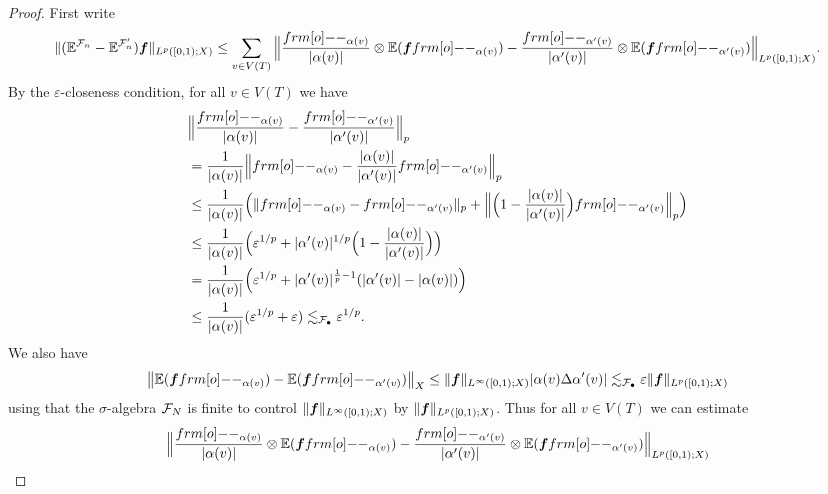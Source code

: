 \begin{proof}
  First write
  \begin{equation*}
    \|(\E^{\mc{F}_{n}} - \E^{\mc{F}_{n}'})\mb{f}\|_{L^p([0,1);X)} \leq \sum_{v \in V(T)} \Big\| \frac{\1_{\alpha(v)}}{|\alpha(v)|} \otimes \E(\mb{f}\1_{\alpha(v)}) - \frac{\1_{\alpha'(v)}}{|\alpha'(v)|} \otimes \E(\mb{f}\1_{\alpha'(v)}) \Big\|_{L^p([0,1);X)}.
  \end{equation*}
  By the $\varepsilon$-closeness condition, for all $v \in V(T)$ we have
  \begin{equation*}
    \begin{aligned}
      &\Big\| \frac{\1_{\alpha(v)}}{|\alpha(v)|} - \frac{\1_{\alpha'(v)}}{|\alpha'(v)|} \Big\|_{p} \\
      &= \frac{1}{|\alpha(v)|} \Big\| \1_{\alpha(v)} - \frac{|\alpha(v)|}{|\alpha'(v)|} \1_{\alpha'(v)} \Big\|_{p} \\
      &\leq \frac{1}{|\alpha(v)|} \Big( \| \1_{\alpha(v)} - \1_{\alpha'(v)} \|_{p} + \Big\| \Big( 1 - \frac{|\alpha(v)|}{|\alpha'(v)|} \Big) \1_{\alpha'(v)} \Big\|_{p} \Big) \\
      &\leq \frac{1}{|\alpha(v)|} \Big( \varepsilon^{1/p} + |\alpha'(v)|^{1/p}\Big(1 - \frac{|\alpha(v)|}{|\alpha'(v)|} \Big) \Big) \\
      &= \frac{1}{|\alpha(v)|} \Big( \varepsilon^{1/p} + |\alpha'(v)|^{\frac{1}{p} - 1} (|\alpha'(v)| - |\alpha(v)| ) \Big) \\
      &\leq \frac{1}{|\alpha(v)|} (\varepsilon^{1/p} + \varepsilon) 
      \lesssim_{\mc{F}_{\bullet}} \varepsilon^{1/p}.
  \end{aligned}
\end{equation*}
We also have
\begin{equation*}
  \begin{aligned}
    \big\| \E(\mb{f}\1_{\alpha(v)}) - \E(\mb{f}\1_{\alpha'(v)}) \big\|_{X}
    \leq \|\mb{f}\|_{L^\infty([0,1);X)} |\alpha(v) \Delta \alpha'(v)| \lesssim_{\mc{F}_{\bullet}} \varepsilon \|\mb{f}\|_{L^p([0,1);X)}
  \end{aligned}
\end{equation*}
using that the $\sigma$-algebra $\mathcal{F}_{N}$ is finite to control $\|\bm{f}\|_{L^\infty([0,1);X)}$ by $\|\bm{f}\|_{L^p([0,1);X)}$.
Thus for all $v \in V(T)$ we can estimate
\begin{equation*}
  \begin{aligned}
    &\Big\| \frac{\1_{\alpha(v)}}{|\alpha(v)|} \otimes \E(\mb{f}\1_{\alpha(v)}) - \frac{\1_{\alpha'(v)}}{|\alpha'(v)|} \otimes \E(\mb{f}\1_{\alpha'(v)}) \Big\|_{L^p([0,1);X)} \\

\end{aligned}
\end{equation*}
\end{proof}
